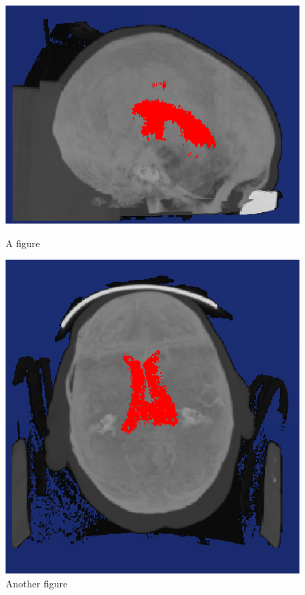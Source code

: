\begin{figure}[H]
\begin{minipage}[b]{.5\textwidth}
  \centering
  \includegraphics[width=.9\linewidth, height=.9\linewidth]{Logos/Normal1/Seite.PNG}
  \caption{A figure}
  \label{fig:test1}
\end{minipage}%
\begin{minipage}[b]{.5\textwidth}
  \centering
  \includegraphics[width=.9\linewidth, height=.9\linewidth]{Logos/Normal1/Unten.PNG}
  \caption{Another figure}
  \label{fig:test2}
\end{minipage}
\end{figure}


